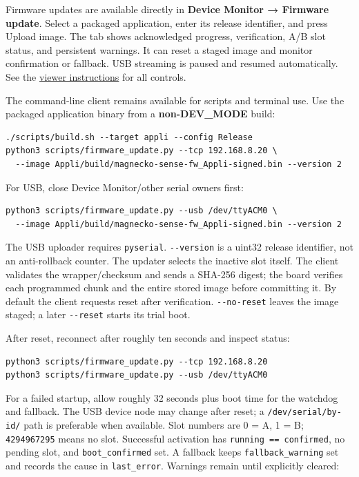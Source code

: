 \documentclass[10pt,a4paper,oneside]{report}
\begin{document}
Firmware updates are available directly in \textbf{Device Monitor → Firmware update}. Select a packaged application, enter its release identifier, and press Upload image. The tab shows acknowledged progress, verification, A/B slot status, and persistent warnings. It can reset a staged image and monitor confirmation or fallback. USB streaming is paused and resumed automatically. See the \hyperref[wiki-tools-device-monitor--firmware-updates]{viewer instructions} for all controls.

The command-line client remains available for scripts and terminal use. Use the packaged application binary from a \textbf{non-DEV\_MODE} build:

\begin{verbatim}
./scripts/build.sh --target appli --config Release
python3 scripts/firmware_update.py --tcp 192.168.8.20 \
  --image Appli/build/magnecko-sense-fw_Appli-signed.bin --version 2
\end{verbatim}

For USB, close Device Monitor/other serial owners first:

\begin{verbatim}
python3 scripts/firmware_update.py --usb /dev/ttyACM0 \
  --image Appli/build/magnecko-sense-fw_Appli-signed.bin --version 2
\end{verbatim}

The USB uploader requires \texttt{pyserial}. \texttt{-\allowbreak{}-\allowbreak{}version} is a uint32 release identifier, not an anti-rollback counter. The updater selects the inactive slot itself. The client validates the wrapper/checksum and sends a SHA-256 digest; the board verifies each programmed chunk and the entire stored image before committing it. By default the client requests reset after verification. \texttt{-\allowbreak{}-\allowbreak{}no-\allowbreak{}reset} leaves the image staged; a later \texttt{-\allowbreak{}-\allowbreak{}reset} starts its trial boot.

After reset, reconnect after roughly ten seconds and inspect status:

\begin{verbatim}
python3 scripts/firmware_update.py --tcp 192.168.8.20
python3 scripts/firmware_update.py --usb /dev/ttyACM0
\end{verbatim}

For a failed startup, allow roughly 32 seconds plus boot time for the watchdog and fallback. The USB device node may change after reset; a \texttt{/\allowbreak{}dev/\allowbreak{}serial/\allowbreak{}by-\allowbreak{}id/\allowbreak{}} path is preferable when available. Slot numbers are 0 = A, 1 = B; \texttt{4294967295} means no slot. Successful activation has \texttt{running == confirmed}, no pending slot, and \texttt{boot\_\allowbreak{}confirmed} set. A fallback keeps \texttt{fallback\_\allowbreak{}warning} set and records the cause in \texttt{last\_\allowbreak{}error}. Warnings remain until explicitly cleared:
\end{document}
